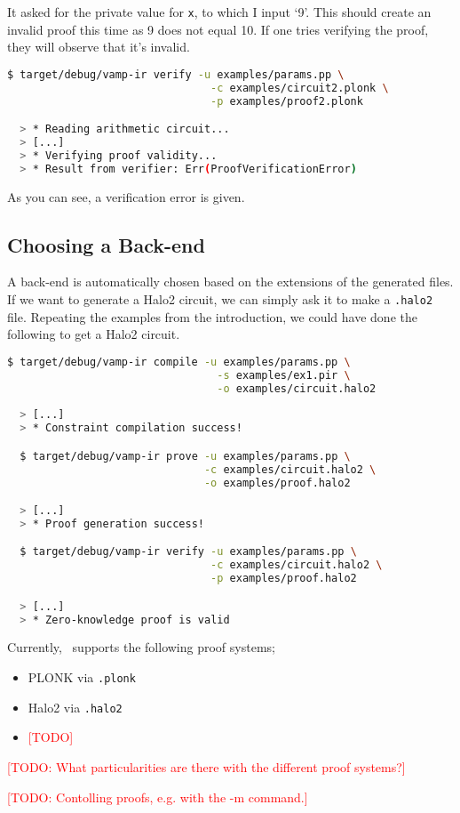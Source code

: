 It asked for the private value for \lstinline{x}, to which I input `9'. This should create an invalid proof this time as 9 does not equal 10. If one tries verifying the proof, they will observe that it's invalid.

\begin{lstlisting}[language=bash]
  $ target/debug/vamp-ir verify -u examples/params.pp \
                                -c examples/circuit2.plonk \
                                -p examples/proof2.plonk

  > * Reading arithmetic circuit...
  > [...]
  > * Verifying proof validity...
  > * Result from verifier: Err(ProofVerificationError)
\end{lstlisting}

As you can see, a verification error is given.

\subsection{Choosing a Back-end}

A back-end is automatically chosen based on the extensions of the generated files. If we want to generate a Halo2 circuit, we can simply ask it to make a \lstinline{.halo2} file. Repeating the examples from the introduction, we could have done the following to get a Halo2 circuit.

\begin{lstlisting}[language=bash]
  $ target/debug/vamp-ir compile -u examples/params.pp \
                                 -s examples/ex1.pir \
                                 -o examples/circuit.halo2
                                 
  > [...]
  > * Constraint compilation success!

  $ target/debug/vamp-ir prove -u examples/params.pp \
                               -c examples/circuit.halo2 \
                               -o examples/proof.halo2

  > [...]
  > * Proof generation success!

  $ target/debug/vamp-ir verify -u examples/params.pp \
                                -c examples/circuit.halo2 \
                                -p examples/proof.halo2

  > [...]
  > * Zero-knowledge proof is valid
\end{lstlisting}

Currently, \vampir\ supports the following proof systems;

\begin{itemize}
\item PLONK via \lstinline{.plonk}
\item Halo2 via \lstinline{.halo2}
\item \textcolor{red}{[TODO]}
\end{itemize}

\textcolor{red}{[TODO: What particularities are there with the different proof systems?]}

\textcolor{red}{[TODO: Contolling proofs, e.g. with the -m command.]}
